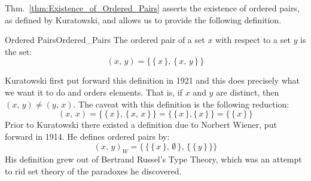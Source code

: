         Thm.~\ref{thm:Existence_of_Ordered_Pairs} asserts the existence of
        ordered pairs, as defined by Kuratowski, and allows us to provide
        the following definition.
        \begin{fdefinition}{Ordered Pairs}{Ordered_Pairs}
            The \gls{ordered pair} of a \gls{set} $x$ with respect to a set
            $y$ is the set:
            \begin{equation}
                (x,\,y)=\big\{\,\{\,x\,\},\,\{\,x,\,y\,\}\,\big\}
            \end{equation}
        \end{fdefinition}
        Kuratowski first put forward this definition in 1921 and this does
        precisely what we want it to do and orders elements. That is, if
        $x$ and $y$ are distinct, then $(x,\,y)\ne(y,\,x)$. The caveat with
        this definition is the following reduction:
        \begin{equation}
            (x,\,x)
            =\big\{\,\{\,x\,\},\,\{\,x,\,x\,\}\,\big\}
            =\big\{\,\{\,x\,\},\{\,x\,\}\,\big\}
            =\big\{\,\{\,x\,\}\,\big\}
        \end{equation}
        Prior to Kuratowski there existed a definition due to Norbert Wiener,
        put forward in 1914. He defines ordered pairs by:
        \begin{equation}
            (x,\,y)_{W}=\Big\{\,\big\{\,\{\,x\,\},\,\emptyset\,\big\},\,
                                \big\{\,\{\,y\,\}\,\big\}\Big\}
        \end{equation}
        His definition grew out of Bertrand Russel's Type Theory, which was
        an attempt to rid set theory of the paradoxes he discovered.
